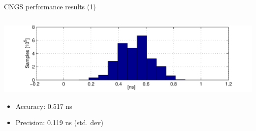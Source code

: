 \documentclass[compress,red]{beamer}
\begin{document}
\begin{frame}{CNGS performance results (1)}

  \begin{columns}[c]
	  \begin{center}

		\hspace{-1cm}
		\includegraphics[width=1.1\textwidth]{measurements/histogram-small.pdf}
		\begin{itemize}
			\item Accuracy: 0.517 ns
			\item Precision: 0.119 ns (std. dev)
		\end{itemize}			



\end{center}
\end{columns}
\end{frame}
\end{document}
